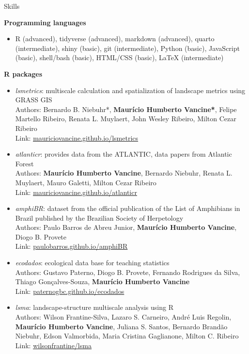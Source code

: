 \documentclass{resume}
\begin{document}
\begin{rSection}{Skills}

{\bf Programming languages}
\begin{itemize}
\item R (advanced), tidyverse (advanced), markdown (advanced), quarto (intermediate), shiny (basic), git (intermediate), Python (basic), JavaScript (basic), shell/bash (basic), HTML/CSS (basic), LaTeX (intermediate)
\end{itemize}

{\bf R packages}
\begin{itemize} 
\item {\it lsmetrics}: multiscale calculation and spatialization of landscape metrics using GRASS GIS\\
Authors: Bernardo B. Niebuhr*, {\bf Maurício Humberto Vancine*}, Felipe Martello Ribeiro, Renata L. Muylaert, John Wesley Ribeiro, Milton Cezar Ribeiro\\
Link: \href{https://mauriciovancine.github.io/lsmetrics}{\underline{mauriciovancine.github.io/lsmetrics}}

\item {\it atlanticr}: provides data from the ATLANTIC, data papers from Atlantic Forest\\
Authors: {\bf Maurício Humberto Vancine}, Bernardo Niebuhr, Renata L. Muylaert, Mauro Galetti, Milton Cezar Ribeiro\\
Link: \href{https://mauriciovancine.github.io/atlanticr}{\underline{mauriciovancine.github.io/atlanticr}}

\item {\it amphiBR}: dataset from the official publication of the List of Amphibians in Brazil published by the Brazilian Society of Herpetology\\
Authors: Paulo Barros de Abreu Junior, {\bf Maurício Humberto Vancine}, Diogo B. Provete\\
Link: \href{https://paulobarros.github.io/amphiBR}{\underline{paulobarros.github.io/amphiBR}}

\item {\it ecodados}: ecological data base for teaching statistics\\
Authors: Gustavo Paterno, Diogo B. Provete, Fernando Rodrigues da Silva, Thiago Gonçalves-Souza, {\bf Maurício Humberto Vancine}\\
Link: \href{https://paternogbc.github.io/ecodados/}{\underline{paternogbc.github.io/ecodados}}

\item {\it lsma}: landscape-structure multiscale analysis using R\\
Authors: Wilson Frantine-Silva, Lazaro S. Carneiro, André Luis Regolin, {\bf Maurício Humberto Vancine}, Juliana S. Santos, Bernardo Brandão Niebuhr, Edson Valmorbida, Maria Cristina Gaglianone, Milton C. Ribeiro\\
Link: \href{https://github.com/wilsonfrantine/landscapeDecoupler}{\underline{wilsonfrantine/lsma}}


\end{itemize}
\end{rSection}
\end{document}
